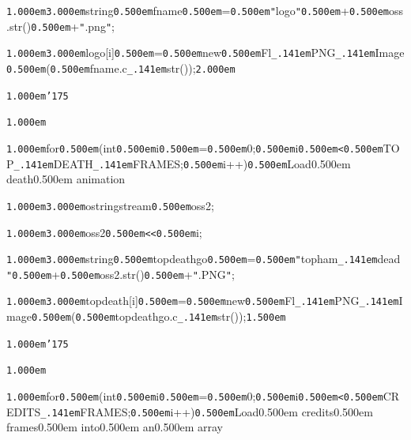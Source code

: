 \documentclass[12pt]{article}
\begin{document}
\noindent
{}{\tt\mc \kern1.000em}{\tt\mc \kern3.000em}string{\tt\mc \kern0.500em}fname{\tt\mc \kern0.500em}={\tt\mc \kern0.500em}{\tt "}logo{\tt "}{\tt\mc \kern0.500em}+{\tt\mc \kern0.500em}oss.str(){\tt\mc \kern0.500em}+{\tt "}.png{\tt "};

\noindent
{}{\tt\mc \kern1.000em}{\tt\mc \kern3.000em}logo[i]{\tt\mc \kern0.500em}={\tt\mc \kern0.500em}new{\tt\mc \kern0.500em}Fl{\tt\_\kern.141em}PNG{\tt\_\kern.141em}Image{\tt\mc \kern0.500em}({\tt\mc \kern0.500em}fname.c{\tt\_\kern.141em}str());{\tt\mc \kern2.000em}

\noindent
{}{\tt\mc \kern1.000em}{\tt\char'175}

\noindent
{}{\tt\mc \kern1.000em}

\noindent
{}{\tt\mc \kern1.000em}for{\tt\mc \kern0.500em}(int{\tt\mc \kern0.500em}i{\tt\mc \kern0.500em}={\tt\mc \kern0.500em}0;{\tt\mc \kern0.500em}i{\tt\mc \kern0.500em}{\tt <}{\tt\mc \kern0.500em}TOP{\tt\_\kern.141em}DEATH{\tt\_\kern.141em}FRAMES;{\tt\mc \kern0.500em}i++){\tt\mc \kern0.500em}\rm\mc {\tt /}{\tt /}Load\kern0.500em death\kern0.500em animation

\noindent
\tt{}

\noindent
{}{\tt\mc \kern1.000em}{\tt\mc \kern3.000em}ostringstream{\tt\mc \kern0.500em}oss2;

\noindent
{}{\tt\mc \kern1.000em}{\tt\mc \kern3.000em}oss2{\tt\mc \kern0.500em}{\tt <}{\tt <}{\tt\mc \kern0.500em}i;

\noindent
{}{\tt\mc \kern1.000em}{\tt\mc \kern3.000em}string{\tt\mc \kern0.500em}topdeathgo{\tt\mc \kern0.500em}={\tt\mc \kern0.500em}{\tt "}topham{\tt\_\kern.141em}dead{\tt "}{\tt\mc \kern0.500em}+{\tt\mc \kern0.500em}oss2.str(){\tt\mc \kern0.500em}+{\tt "}.PNG{\tt "};

\noindent
{}{\tt\mc \kern1.000em}{\tt\mc \kern3.000em}topdeath[i]{\tt\mc \kern0.500em}={\tt\mc \kern0.500em}new{\tt\mc \kern0.500em}Fl{\tt\_\kern.141em}PNG{\tt\_\kern.141em}Image{\tt\mc \kern0.500em}({\tt\mc \kern0.500em}topdeathgo.c{\tt\_\kern.141em}str());{\tt\mc \kern1.500em}

\noindent
{}{\tt\mc \kern1.000em}{\tt\char'175}

\noindent
{}{\tt\mc \kern1.000em}

\noindent
{}{\tt\mc \kern1.000em}for{\tt\mc \kern0.500em}(int{\tt\mc \kern0.500em}i{\tt\mc \kern0.500em}={\tt\mc \kern0.500em}0;{\tt\mc \kern0.500em}i{\tt\mc \kern0.500em}{\tt <}{\tt\mc \kern0.500em}CREDITS{\tt\_\kern.141em}FRAMES;{\tt\mc \kern0.500em}i++){\tt\mc \kern0.500em}\rm\mc {\tt /}{\tt /}Load\kern0.500em credits\kern0.500em frames\kern0.500em into\kern0.500em an\kern0.500em array
\end{document}
